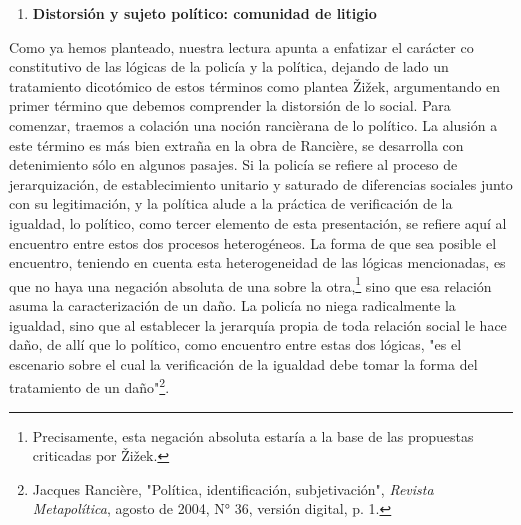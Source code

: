 \documentclass{book}
\begin{document}
\begin{enumerate}
\def\labelenumi{\arabic{enumi}.}
\setcounter{enumi}{3}
\item
  \textbf{Distorsión y sujeto político: comunidad de litigio}
\end{enumerate}

Como ya hemos planteado, nuestra lectura apunta a enfatizar el carácter
co constitutivo de las lógicas de la policía y la política, dejando de
lado un tratamiento dicotómico de estos términos como plantea Žižek,
argumentando en primer término que debemos comprender la distorsión de
lo social. Para comenzar, traemos a colación una noción rancièrana de lo
político. La alusión a este término es más bien extraña en la obra de
Rancière, se desarrolla con detenimiento sólo en algunos pasajes. Si la
policía se refiere al proceso de jerarquización, de establecimiento
unitario y saturado de diferencias sociales junto con su legitimación, y
la política alude a la práctica de verificación de la igualdad, lo
político, como tercer elemento de esta presentación, se refiere aquí al
encuentro entre estos dos procesos heterogéneos. La forma de que sea
posible el encuentro, teniendo en cuenta esta heterogeneidad de las
lógicas mencionadas, es que no haya una negación absoluta de una sobre
la otra,\footnote{Precisamente, esta negación absoluta estaría a la base
  de las propuestas criticadas por Žižek.} sino que esa relación asuma
la caracterización de un daño. La policía no niega radicalmente la
igualdad, sino que al establecer la jerarquía propia de toda relación
social le hace daño, de allí que lo político, como encuentro entre estas
dos lógicas, "es el escenario sobre el cual la verificación de la
igualdad debe tomar la forma del tratamiento de un daño"\footnote{Jacques
  Rancière, "Política, identificación, subjetivación", \emph{Revista
  Metapolítica}, agosto de 2004, N° 36, versión digital, p. 1.}.
\end{document}

